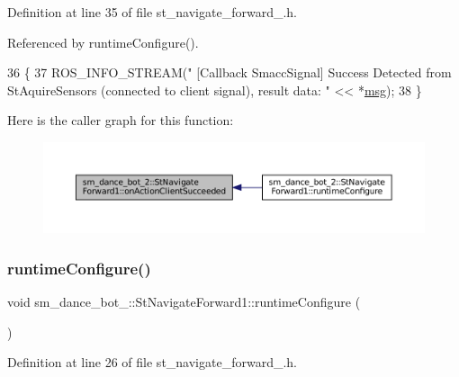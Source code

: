 Definition at line 35 of file st\+\_\+navigate\+\_\+forward\+\_.\+h.



Referenced by runtime\+Configure().


\begin{DoxyCode}
36   \{
37     ROS\_INFO\_STREAM(\textcolor{stringliteral}{" [Callback SmaccSignal] Success Detected from StAquireSensors (connected to client
       signal), result data: "} << *\hyperlink{namespacebattery__monitor__node_ab1920c64448816edd4064e494275fdff}{msg});
38   \}
\end{DoxyCode}
Here is the caller graph for this function\+:
\nopagebreak
\begin{figure}[H]
\begin{center}
\leavevmode
\includegraphics[width=350pt]{structsm__dance__bot__2_1_1StNavigateForward1_a6ca4d488672e844032a5ddd3a14d5942_icgraph}
\end{center}
\end{figure}
\mbox{\label{structsm__dance__bot__2_1_1StNavigateForward1_a2e6dc2fa60d7ef43ba41a1455bba358f}} 
\subsubsection{\texorpdfstring{runtime\+Configure()}{runtimeConfigure()}}
{\footnotesize\ttfamily void sm\+\_\+dance\+\_\+bot\+\_\+::\+St\+Navigate\+Forward1\+::runtime\+Configure (\begin{DoxyParamCaption}{ }\end{DoxyParamCaption})\hspace{0.3cm}{\ttfamily [inline]}}



Definition at line 26 of file st\+\_\+navigate\+\_\+forward\+\_.\+h.



